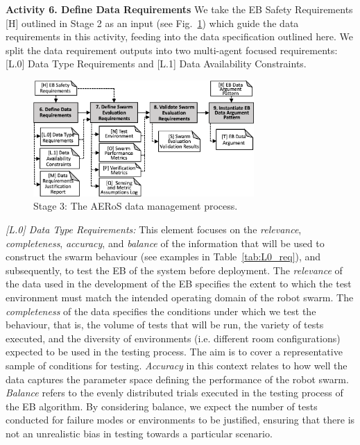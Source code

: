 \documentclass[runningheads]{llncs}
\begin{document}
\noindent\textbf{Activity 6. Define Data Requirements} 
We take the EB Safety Requirements [H] outlined in Stage 2 as an input (see Fig.~\ref{amlas-a-stage3}) which guide the data requirements in this activity, feeding into the data specification outlined here. We split the data requirement outputs into two multi-agent focused requirements: [L.0] Data Type Requirements and [L.1] Data Availability Constraints.
\begin{figure}[!t]%
	\centering
	\vspace{-1ex} %
	\includegraphics[width=0.75\textwidth]{figures/AERoS-Stage3-V2.pdf}
	\vspace{-2ex} %
	\caption{Stage 3: The AERoS data management process.}
	\label{amlas-a-stage3}
\end{figure}

\emph{[L.0] Data Type Requirements:}
This element focuses on the \emph{relevance}, \emph{completeness}, \emph{accuracy}, and \emph{balance} of the information that will be used to construct the swarm behaviour (see examples in Table~\ref{tab:L0_req}), and subsequently, to test the EB of the system before deployment. The \emph{relevance} of the data used in the development of the EB specifies the extent to which the test environment must match the intended operating domain of the robot swarm. The \emph{completeness} of the data specifies the conditions under which we test the behaviour, that is, the volume of tests that will be run, the variety of tests executed, and the diversity of environments (i.e. different room configurations) expected to be used in the testing process. The aim is to cover a representative sample of conditions for testing. 
\emph{Accuracy} in this context relates to how well the data captures the parameter space defining the performance of the robot swarm. 
\emph{Balance} refers to the evenly distributed trials executed in the testing process of the EB algorithm.  
By considering balance, we expect the number of tests conducted for failure modes or environments to be justified, ensuring that there is not an unrealistic bias in testing towards a particular scenario. 
\end{document}
